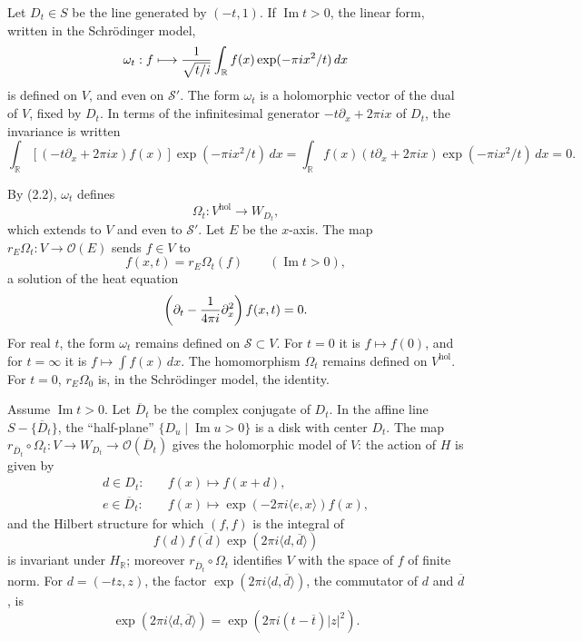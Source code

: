 \documentclass[11pt]{article}
\newcommand{\R}{\mathbb R}
\newcommand{\cO}{\mathcal O}
\newcommand{\hol}{\mathrm{hol}}
\newcommand{\dd}{\,d}
\begin{document}
Let $D_t\in S$ be the line generated by $(-t,1)$. If $\operatorname{Im}t>0$, the linear form, written in the Schr\"odinger model,
\[
\omega_t:f\longmapsto {1\over\sqrt{t/i}}\int_\R f(x)\exp(-\pi ix^2/t)\dd x
\]
is defined on $V$, and even on $\mathscr S'$. The form $\omega_t$ is a holomorphic vector of the dual of $V$, fixed by $D_t$. In terms of the infinitesimal generator $-t\partial_x+2\pi ix$ of $D_t$, the invariance is written
\[
\int_\R [(-t\partial_x+2\pi ix)f(x)]\exp(-\pi ix^2/t)\dd x
=\int_\R f(x)(t\partial_x+2\pi ix)\exp(-\pi ix^2/t)\dd x=0.
\]

By (2.2), $\omega_t$ defines
\[
\Omega_t:V^{\hol}\longrightarrow W_{D_t},
\]
which extends to $V$ and even to $\mathscr S'$. Let $E$ be the $x$-axis. The map $r_E\Omega_t:V\to\cO(E)$ sends $f\in V$ to
\[
f(x,t)=r_E\Omega_t(f)\qquad (\operatorname{Im}t>0),
\]
a solution of the heat equation
\[
\left(\partial_t-{1\over4\pi i}\partial_x^2\right)f(x,t)=0.
\]
For real $t$, the form $\omega_t$ remains defined on $\mathscr S\subset V$. For $t=0$ it is $f\mapsto f(0)$, and for $t=\infty$ it is $f\mapsto \int f(x)\dd x$. The homomorphism $\Omega_t$ remains defined on $V^{\hol}$. For $t=0$, $r_E\Omega_0$ is, in the Schr\"odinger model, the identity.

Assume $\operatorname{Im}t>0$. Let $\overline D_t$ be the complex conjugate of $D_t$. In the affine line $S-\{\overline D_t\}$, the ``half-plane'' $\{D_u\mid \operatorname{Im}u>0\}$ is a disk with center $D_t$. The map $r_{\overline D_t}\circ\Omega_t:V\to W_{D_t}\to \cO(\overline D_t)$ gives the holomorphic model of $V$: the action of $H$ is given by
\[
\begin{aligned}
d\in D_t:&\quad f(x)\longmapsto f(x+d),\\
e\in \overline D_t:&\quad f(x)\longmapsto \exp(-2\pi i\langle e,x\rangle)f(x),
\end{aligned}
\]
and the Hilbert structure for which $(f,f)$ is the integral of
\[
f(d)\overline{f(d)}\exp(2\pi i\langle d,\overline d\rangle)
\]
is invariant under $H_\R$; moreover $r_{\overline D_t}\circ\Omega_t$ identifies $V$ with the space of $f$ of finite norm. For $d=(-tz,z)$, the factor $\exp(2\pi i\langle d,\overline d\rangle)$, the commutator of $d$ and $\overline d$, is
\[
\exp(2\pi i\langle d,\overline d\rangle)=\exp(2\pi i(t-\overline t)|z|^2).
\]
\end{document}
